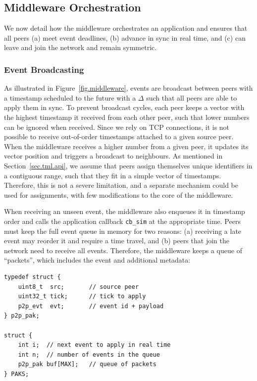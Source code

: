 \documentclass[fleqn,10pt]{SelfArx}
\newcommand{\code}[1]  {\texttt{\footnotesize{#1}}}
\begin{document}
\subsection{Middleware Orchestration}
\label{sec.tml.middleware}

We now detail how the middleware orchestrates an application and ensures that
all peers
    (a) meet event deadlines,
    (b) advance in sync in real time, and
    (c) can leave and join the network and remain symmetric.

\subsubsection{Event Broadcasting}
\label{sec.tml.middleware.events}

As illustrated in Figure~\ref{fig.middleware}, events are broadcast between
peers with a timestamp scheduled to the future with a $\Delta$ such that all
peers are able to apply them in sync.
%
To prevent broadcast cycles, each peer keeps a vector with the highest
timestamp it received from each other peer, such that lower numbers can be
ignored when received.
Since we rely on TCP connections, it is not possible to receive out-of-order
timestamps attached to a given source peer.
When the middleware receives a higher number from a given peer, it updates its
vector position and triggers a broadcast to neighbours.
%
As mentioned in Section~\ref{sec.tml.api}, we assume that peers assign
themselves unique identifiers in a contiguous range, such that they fit in a
simple vector of timestamps.
Therefore, this is not a severe limitation, and a separate mechanism could be
used for assignments, with few modifications to the core of the middleware.

When receiving an unseen event, the middleware also enqueues it in timestamp
order and calls the application callback \code{cb\_sim} at the appropriate
time.
Peers must keep the full event queue in memory for two reasons:
    (a) receiving a late event may reorder it and require a time travel, and
    (b) peers that join the network need to receive all events.
%
Therefore, the middleware keeps a queue of ``packets'', which includes the
event and additional metadata:

{\footnotesize
\begin{verbatim}
typedef struct {
    uint8_t  src;       // source peer
    uint32_t tick;      // tick to apply
    p2p_evt  evt;       // event id + payload
} p2p_pak;

struct {
    int i;  // next event to apply in real time
    int n;  // number of events in the queue
    p2p_pak buf[MAX];   // queue of packets
} PAKS;
\end{verbatim}
}
\end{document}
